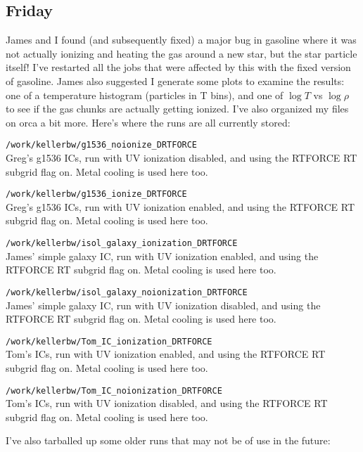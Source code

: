 \documentclass[11pt,letterpaper]{article}
\begin{document}
\subsection*{Friday}
James and I found (and subsequently fixed) a major bug in gasoline where it was
not actually ionizing and heating the gas around a new star, but the star 
particle itself!  I've restarted all the jobs that were affected by this with 
the fixed version of gasoline.  James also suggested I generate some plots to 
examine the results:  one of a temperature histogram (particles in T bins),
and one of $\log T$ vs  $\log\rho$ to see if the gas chunks are actually getting
ionized.  I've also organized my files on orca a bit more.  Here's where the
runs are all currently stored:
\begin{description}
\item{\verb!/work/kellerbw/g1536_noionize_DRTFORCE!}\\ Greg's g1536 ICs, run with
UV ionization disabled, and using the RTFORCE RT subgrid flag on.  Metal cooling
is used here too.
\item{\verb!/work/kellerbw/g1536_ionize_DRTFORCE!}\\ Greg's g1536 ICs, run with
UV ionization enabled, and using the RTFORCE RT subgrid flag on.  Metal cooling
is used here too.
\item{\verb!/work/kellerbw/isol_galaxy_ionization_DRTFORCE!}\\ James' simple 
galaxy IC, run with UV ionization enabled, and using the RTFORCE RT subgrid 
flag on.  Metal cooling is used here too.
\item{\verb!/work/kellerbw/isol_galaxy_noionization_DRTFORCE!}\\ James' simple 
galaxy IC, run with UV ionization disabled, and using the RTFORCE RT subgrid 
flag on.  Metal cooling is used here too.
\item{\verb!/work/kellerbw/Tom_IC_ionization_DRTFORCE!}\\ Tom's ICs, run with
UV ionization enabled, and using the RTFORCE RT subgrid flag on.  Metal cooling
is used here too.
\item{\verb!/work/kellerbw/Tom_IC_noionization_DRTFORCE!}\\ Tom's ICs, run with
UV ionization disabled, and using the RTFORCE RT subgrid flag on.  Metal cooling
is used here too.
\end{description}
I've also tarballed up some older runs that may not be of use in the future:
\end{document}
